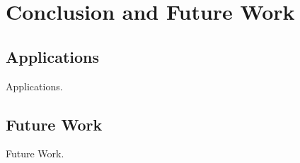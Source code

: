 
\chapter{Conclusion and Future Work}

\label{ch:conclusions}

\section{Applications}

Applications.


\section{Future Work}

Future Work.
